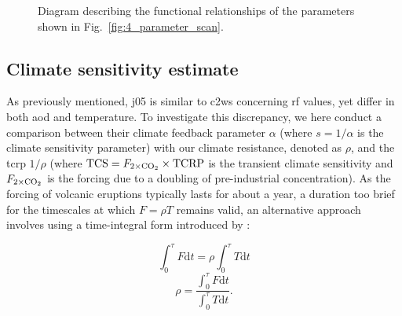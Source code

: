 \documentclass{ametsocV6.1}
\begin{document}
\begin{figure}
  \centering


  \caption{Diagram describing the functional relationships of the parameters shown in
    Fig.~\ref{fig:4_parameter_scan}.}\label{fig:5_diagram_of_function_relations}%
\end{figure}

\subsection{Climate sensitivity estimate}

As previously mentioned, \gls{j05} is similar to \gls{c2ws} concerning \gls{rf} values,
yet differ in both \gls{aod} and temperature. To investigate this discrepancy, we here
conduct a comparison between their climate feedback parameter \(\alpha\) (where
\(s=1/\alpha\) is the climate sensitivity parameter) with our climate resistance,
denoted as \(\rho\), and the \gls{tcrp} \(1/\rho\) (where
\(\mathrm{TCS}=F_{2\times\ce{CO2}}\times \mathrm{TCRP}\) is the transient climate
sensitivity and \(F_{2\times\ce{CO2}}\) is the forcing due to a doubling of
pre-industrial  concentration). As the forcing of volcanic eruptions typically
lasts for about a year, a duration too brief for the timescales at which \(F=\rho T\)
remains valid, an alternative approach involves using a time-integral form introduced by
\citet{merlis2014}:

\begin{equation}
  \int_0^{\tau}F \mathrm{d}t=\rho\int_{0}^{\tau}T \mathrm{d}t
  \label{eq:climate-resistance-orig}
\end{equation}
\begin{equation}
  \rho=\frac{\int_0^{\tau}F \mathrm{d}t}{\int_{0}^{\tau}T \mathrm{d}t}.
  \label{eq:climate-resistance}
\end{equation}
\end{document}
